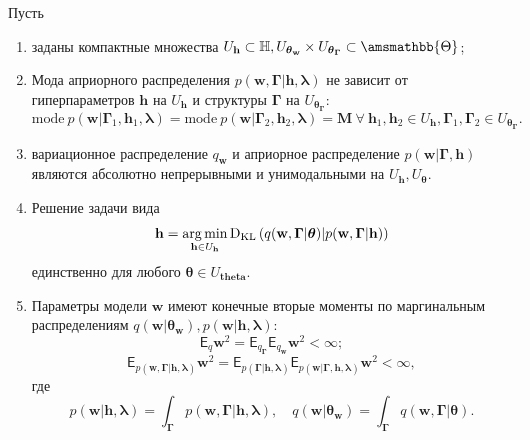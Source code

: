 \begin{theorem}
Пусть
\begin{enumerate}
\item заданы компактные множества $U_\mathbf{h} \subset \mathbb{H}, U_{\boldsymbol{\theta}_\mathbf{w}} \times U_{\boldsymbol{\theta}_{\boldsymbol{\Gamma}}} \subset \amsmathbb{\Theta}$;


\item Мода априорного распределения $p(\mathbf{w},\boldsymbol{\Gamma}| \mathbf{h}, \boldsymbol{\lambda})$ не зависит от гиперпараметров $\mathbf{h}$  на $U_\mathbf{h}$ и структуры $\boldsymbol{\Gamma}$ на $U_{\boldsymbol{\theta}_{\boldsymbol{\Gamma}}}$:
\[\text{mode}~p(\mathbf{w}|\boldsymbol{\Gamma}_1, \mathbf{h}_1, \boldsymbol{\lambda})=\text{mode}~ p(\mathbf{w}|\boldsymbol{\Gamma}_2,\mathbf{h}_2, \boldsymbol{\lambda})=\mathbf{M}~\forall~\mathbf{h}_1, \mathbf{h}_2\in U_\mathbf{h},\boldsymbol{\Gamma}_1, \boldsymbol{\Gamma}_2\in U_{\boldsymbol{\theta}_{\boldsymbol{\Gamma}}}.
\]

\item вариационное распределение $q_\mathbf{w}$ и априорное распределение $p(\mathbf{w}|\boldsymbol{\Gamma}, \mathbf{h})$  являются абсолютно непрерывными и унимодальными на  $U_\mathbf{h}, U_{\boldsymbol{\theta}}$.

\item Решение задачи вида 
\begin{equation}
\label{eq:dkl_solve}
\mathbf{h} = \operatorname*{arg\,min}_{\mathbf{h} \in U_\mathbf{h}} \text{D}_\text{KL}\left(q(\mathbf{w}, \boldsymbol{\Gamma}|\boldsymbol{\theta})|p(\mathbf{w}, \boldsymbol{\Gamma}|\mathbf{h})\right)
\end{equation} единственно для любого $\boldsymbol{\theta} \in U_{\boldsymbol{theta}}$.
 
\item Параметры модели $\mathbf{w}$ имеют конечные вторые моменты по маргинальным распределениям $q(\mathbf{w}|\boldsymbol{\theta}_{\mathbf{w}}), p(\mathbf{w}|\mathbf{h}, \boldsymbol{\lambda})$:
\[
    \mathsf{E}_q \mathbf{w}^2 = \mathsf{E}_{q_{\boldsymbol{\Gamma}}}\mathsf{E}_{q_\mathbf{w}}\mathbf{w}^2 < \infty;
\]
\[
    \mathsf{E}_{p(\mathbf{w},\boldsymbol{\Gamma}|\mathbf{h}, \boldsymbol{\lambda})}\mathbf{w}^2 = \mathsf{E}_{p(\boldsymbol{\Gamma}|\mathbf{h}, \boldsymbol{\lambda})} \mathsf{E}_{p(\mathbf{w}|\boldsymbol{\Gamma}, \mathbf{h}, \boldsymbol{\lambda})}\mathbf{w}^2 < \infty,
\]
где 
\[
    p(\mathbf{w}|\mathbf{h},\boldsymbol{\lambda}) = \int_{\boldsymbol{\Gamma}} p(\mathbf{w}, \boldsymbol{\Gamma}|\mathbf{h}, \boldsymbol{\lambda}), \quad
        q(\mathbf{w}|\boldsymbol{\theta}_\mathbf{w}) = \int_{\boldsymbol{\Gamma}} q(\mathbf{w}, \boldsymbol{\Gamma}|\boldsymbol{\theta}).
\]


\end{enumerate}
\end{theorem}
